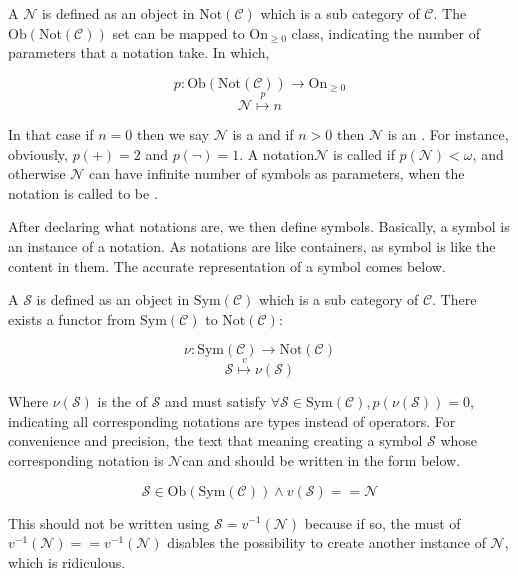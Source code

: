 \documentclass{article}
\begin{document}
 A  \(\mathcal{N}\) is defined as an object in \(\text{Not}(\mathcal{C})\) which is a sub category of \(\mathcal{C}\). The \(\text{Ob}(\text{Not}(\mathcal{C}))\) set can be mapped to \(\text{On}_{\geq 0}\) class, indicating the number of parameters that a notation take. In which,

\[\mathit{p}:\text{Ob}(\text{Not}(\mathcal{C}))\to \text{On}_{\geq 0}\]
\[\mathcal{N}\overset{\mathit{p}}{\mapsto }n\]

In that case if \(n=0\) then we say \(\mathcal{N}\) is a  and if \(n>0\) then \(\mathcal{N}\) is an . For instance, obviously, \(\mathit{p}(+)=2\) and \(\mathit{p}(\neg )=1\). A notation\(\mathcal{N}\) is called  if \(\mathit{p}(\mathcal{N})<\omega\), and otherwise \(\mathcal{N}\) can have infinite number of symbols as parameters, when the notation is called to be .

After declaring what notations are, we then define symbols. Basically, a symbol is an instance of a notation. As notations are like containers, as symbol is like the content in them. The accurate representation of a symbol comes below.

 A  \(\mathcal{S}\) is defined as an object in \(\text{Sym}(\mathcal{C})\) which is a sub category of \(\mathcal{C}\). There exists a functor from \(\text{Sym}(\mathcal{C})\) to \(\text{Not}(\mathcal{C})\):

\[\nu :\text{Sym}(\mathcal{C})\to \text{Not}(\mathcal{C})\]
\[\mathcal{S}\overset{\mathit{v}}{\mapsto }\nu (\mathcal{S})\]

Where \(\nu (\mathcal{S})\) is the  of \(\mathcal{S}\) and must satisfy \(\forall \mathcal{S}\in \text{Sym}(\mathcal{C}),\mathit{p}(\nu (\mathcal{S}))=0\), indicating all corresponding notations are types instead of operators. For convenience and precision, the text that meaning creating a symbol \(\mathcal{S}\) whose corresponding notation is \(\mathcal{N}\)can and should be written in the form below.

\[\mathcal{S}\in \text{Ob}(\text{Sym}(\mathcal{C}))\land \mathit{v}(\mathcal{S})==\mathcal{N}\]

This should not be written using \(\mathcal{S}=\mathit{v}^{-1}(\mathcal{N})\) because if so, the must of \(\mathit{v}^{-1}(\mathcal{N})==\mathit{v}^{-1}(\mathcal{N})\) disables the possibility to create another instance of \(\mathcal{N}\), which is ridiculous. 
\end{document}
